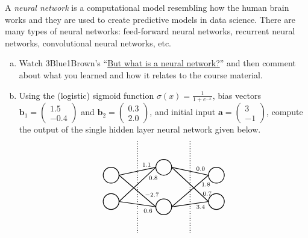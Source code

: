 \documentclass[11pt,letterpaper]{article}
\begin{document}
 A \textit{neural network} is a computational model resembling how the human brain works and they are used to create predictive models in data science. There are many types of neural networks: feed-forward neural networks, recurrent neural networks, convolutional neural networks, etc. 
	\begin{enumerate}[(a)]
	\item Watch 3Blue1Brown's ``\href{https://www.youtube.com/watch?v=aircAruvnKk&list=PLZHQObOWTQDNU6R1_67000Dx_ZCJB-3pi&ab_channel=3Blue1Brown}{But what is a neural network?}'' and then comment about what you learned and how it relates to the course material. 
	\item Using the (logistic) sigmoid function $\sigma(x)= \frac{1}{1 + e^{-x}}$, bias vectors $\mathbf{b}_1= \begin{pmatrix} 1.5 \\ -0.4 \end{pmatrix}$ and $\mathbf{b}_2= \begin{pmatrix} 0.3 \\ 2.0 \end{pmatrix}$, and initial input $\mathbf{a}= \begin{pmatrix} 3 \\ -1 \end{pmatrix}$, compute the output of the single hidden layer neural network given below. 
		\[
		\begin{tikzpicture}[scale=1.1]
		\draw[line width=0.03cm] (0,0.2) circle (0.3);
		\draw[line width=0.03cm] (0,1.2) circle (0.3);
		\draw[line width=0.03cm] (2,0) circle (0.3);
		\draw[line width=0.03cm] (2,1.5) circle (0.3);
		\draw[line width=0.03cm] (4,0.2) circle (0.3);
		\draw[line width=0.03cm] (4,1.2) circle (0.3);
		
		\draw[line width=0.03cm,dotted] (1,-1) -- (1,2.5);
		\draw[line width=0.03cm,dotted] (3,-1) -- (3,2.5);
		
		\draw[line width=0.03cm] (0.3,1.2) -- (1.7,1.5);
		\draw[line width=0.03cm] (0.3,1.2) -- (1.7,0);
		\draw[line width=0.03cm] (0.3,0.2) -- (1.7,1.5);
		\draw[line width=0.03cm] (0.3,0.2) -- (1.7,0);
		
		\draw[line width=0.03cm] (2.3,1.5) -- (3.7,1.2);
		\draw[line width=0.03cm] (2.3,1.5) -- (3.7,0.2);
		\draw[line width=0.03cm] (2.3,0) -- (3.7,1.2);
		\draw[line width=0.03cm] (2.3,0) -- (3.7,0.2);
		
		\node at (1.35,1.6) {\scriptsize$1.1$};
		\node at (1.6,1.1) {\scriptsize$0.8$};
		\node at (1.55,0.45) {\scriptsize$-2.7$};
		\node at (1.4,-0.15) {\scriptsize$0.6$};
		
		\node at (3.4,1.45) {\scriptsize$0.0$};
		\node at (3.6,0.85) {\scriptsize$1.8$};
		\node at (3.65,0.5) {\scriptsize$0.7$};
		\node at (3.4,0) {\scriptsize$3.4$};
		\end{tikzpicture}
		\]
	\end{enumerate} \pspace
\end{document}
